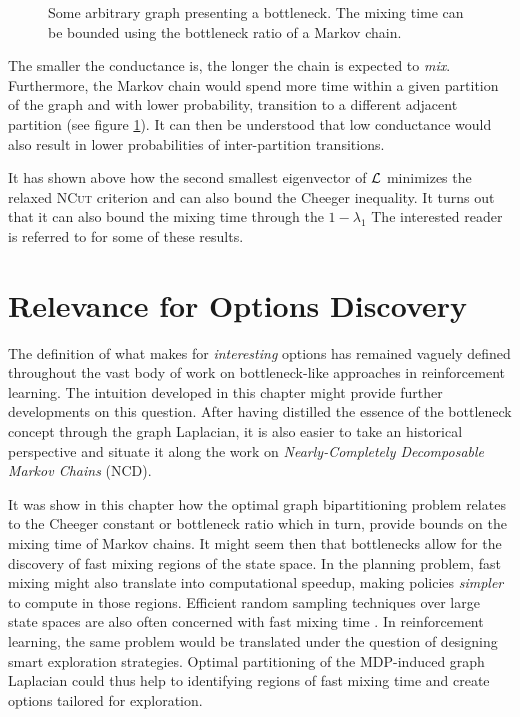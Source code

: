 \begin{figure}
\centering 

\caption{Some arbitrary graph presenting a bottleneck. The mixing time can be bounded using the bottleneck ratio of a Markov chain.}
\label{fig:bottleneck}
\end{figure}

The smaller the conductance is, the longer the chain is expected to \textit{mix}.
Furthermore, the Markov chain would spend more time within a given partition of the
graph and with lower probability, transition to a different adjacent partition (see figure \ref{fig:bottleneck}). It can then be
understood that low conductance would also result in lower probabilities of inter-partition
transitions.

It has shown above how the second smallest eigenvector of $\mathbf{\mathcal{L}}$
minimizes the relaxed \textsc{NCut} criterion and can also bound the Cheeger inequality. It turns out that it can also bound the mixing time through the  $1 - \lambda_1$ The interested reader is referred to \cite{Jerrum1988, Lovasz1996, Levin2008} for some of these results. 

\section{Relevance for Options Discovery}
\label{sec:ndmc}
The definition of what makes for \textit{interesting} options has remained vaguely
defined throughout the vast body of work on bottleneck-like approaches in
reinforcement learning. The intuition developed in this chapter might provide further
developments on this question. After having distilled the essence of the bottleneck
concept through the graph Laplacian, it is also easier to take an historical perspective
and situate it along the work on \textit{Nearly-Completely Decomposable Markov Chains} (NCD).

It was show in this chapter how the optimal graph bipartitioning problem relates to the
Cheeger constant or bottleneck ratio which in turn, provide bounds on the mixing time
of Markov chains. It might seem then that bottlenecks allow for the discovery of fast
mixing regions of the state space. In the planning problem, fast mixing might also translate
into computational speedup, making policies \textit{simpler} to compute in those
regions. Efficient random sampling techniques over large state spaces are also often
concerned with fast mixing time \parencite{Boyd2004}. In reinforcement learning, the same
problem would be translated under the question of designing smart exploration
strategies. Optimal partitioning of the MDP-induced graph Laplacian could thus help to
identifying regions of fast mixing time and create options tailored for exploration.

